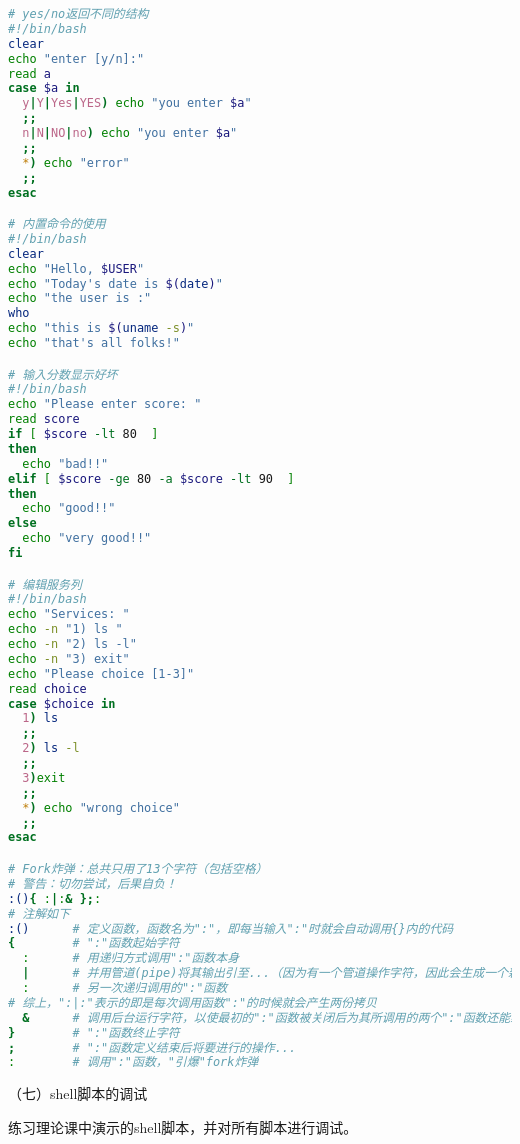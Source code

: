 \begin{lstlisting}[language=bash]
# yes/no返回不同的结构
#!/bin/bash
clear
echo "enter [y/n]:"
read a
case $a in
  y|Y|Yes|YES) echo "you enter $a"
  ;;
  n|N|NO|no) echo "you enter $a"
  ;;
  *) echo "error"
  ;;
esac

# 内置命令的使用
#!/bin/bash
clear
echo "Hello, $USER"
echo "Today's date is $(date)"
echo "the user is :"
who
echo "this is $(uname -s)"
echo "that's all folks!"

# 输入分数显示好坏
#!/bin/bash
echo "Please enter score: "
read score
if [ $score -lt 80  ]
then
  echo "bad!!"
elif [ $score -ge 80 -a $score -lt 90  ]
then
  echo "good!!"
else
  echo "very good!!"
fi

# 编辑服务列
#!/bin/bash
echo "Services: "
echo -n "1) ls "
echo -n "2) ls -l"
echo -n "3) exit"
echo "Please choice [1-3]"
read choice
case $choice in
  1) ls
  ;;
  2) ls -l
  ;;
  3)exit
  ;;
  *) echo "wrong choice"
  ;;
esac

# Fork炸弹：总共只用了13个字符（包括空格）
# 警告：切勿尝试，后果自负！
:(){ :|:& };:
# 注解如下
:()      # 定义函数，函数名为":"，即每当输入":"时就会自动调用{}内的代码
{        # ":"函数起始字符
  :      # 用递归方式调用":"函数本身
  |      # 并用管道(pipe)将其输出引至...（因为有一个管道操作字符，因此会生成一个新的进程）
  :      # 另一次递归调用的":"函数
# 综上，":|:"表示的即是每次调用函数":"的时候就会产生两份拷贝
  &      # 调用后台运行字符，以使最初的":"函数被关闭后为其所调用的两个":"函数还能继续执行
}        # ":"函数终止字符
;        # ":"函数定义结束后将要进行的操作...
:        # 调用":"函数，"引爆"fork炸弹
\end{lstlisting}

\vspace{0.1in}
（七）shell脚本的调试

练习理论课中演示的shell脚本，并对所有脚本进行调试。

